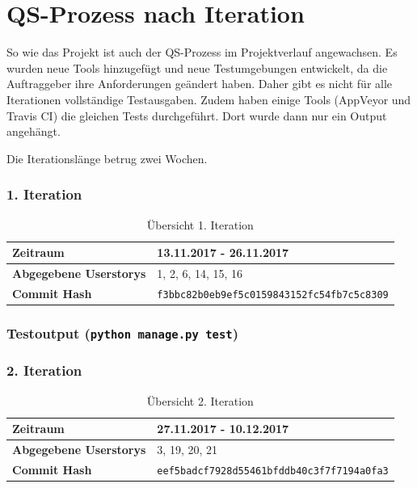\section{QS-Prozess nach Iteration}
So wie das Projekt ist auch der QS-Prozess im Projektverlauf angewachsen. Es wurden neue Tools hinzugefügt
und neue Testumgebungen entwickelt, da die Auftraggeber ihre Anforderungen geändert haben. Daher gibt
es nicht für alle Iterationen vollständige Testausgaben. Zudem haben einige Tools (AppVeyor und Travis CI)
die gleichen Tests durchgeführt. Dort wurde dann nur ein Output angehängt.

Die Iterationslänge betrug zwei Wochen.

\subsubsection{1. Iteration}
\begin{table}[H]
\begin{center}
	\begin{tabular}{| l | l |}
		\hline
		\textbf{Zeitraum} & 13.11.2017 - 26.11.2017\\\hline
		\textbf{Abgegebene Userstorys} & 1, 2, 6, 14, 15, 16 \\\hline
		\textbf{Commit Hash} & \texttt{f3bbc82b0eb9ef5c0159843152fc54fb7c5c8309} \\\hline
	\end{tabular}
	\caption{Übersicht 1. Iteration}
\end{center}
\end{table}

\subsubsection{Testoutput (\texttt{python manage.py test})}


\subsubsection{2. Iteration}
\begin{table}[H]
\begin{center}
	\begin{tabular}{| l | l |}
		\hline
		\textbf{Zeitraum} & 27.11.2017 - 10.12.2017\\\hline
		\textbf{Abgegebene Userstorys} & 3, 19, 20, 21\\\hline
		\textbf{Commit Hash} & \texttt{eef5badcf7928d55461bfddb40c3f7f7194a0fa3} \\\hline
	\end{tabular}
	\caption{Übersicht 2. Iteration}
\end{center}
\end{table}
